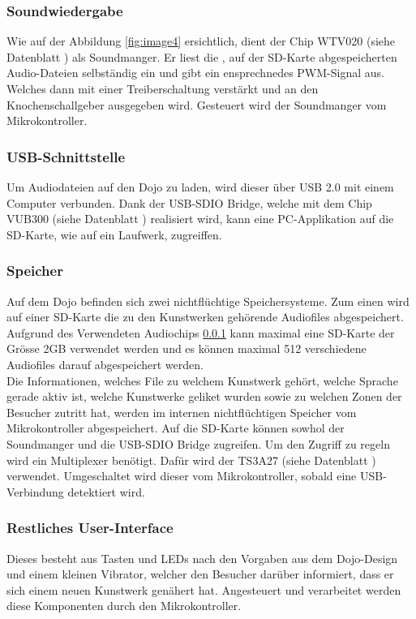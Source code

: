 \documentclass[10pt,a4paper,oneside]{99_fhnwreport}
\begin{document}
\subsubsection{Soundwiedergabe} \label{sec:sound}
Wie auf der Abbildung \ref{fig:image4} ersichtlich, dient der Chip WTV020 (siehe Datenblatt \cite{WTV020}) als Soundmanger. Er liest die , auf der SD-Karte abgespeicherten Audio-Dateien selbständig ein und gibt ein ensprechnedes PWM-Signal aus. Welches dann mit einer Treiberschaltung verstärkt und an den Knochenschallgeber ausgegeben wird. Gesteuert wird der Soundmanger vom  Mikrokontroller.

\subsubsection{USB-Schnittstelle}
Um Audiodateien auf den Dojo zu laden, wird dieser über USB 2.0 mit einem Computer verbunden. Dank der USB-SDIO Bridge, welche mit dem Chip VUB300 (siehe Datenblatt \cite{VUB300}) realisiert wird, kann eine PC-Applikation auf die SD-Karte, wie auf ein Laufwerk, zugreiffen.

\subsubsection{Speicher}
Auf dem Dojo befinden sich zwei nichtflüchtige Speichersysteme.  Zum einen wird auf einer SD-Karte die zu den Kunstwerken gehörende Audiofiles abgespeichert. Aufgrund des Verwendeten Audiochips \ref{sec:sound} kann maximal eine SD-Karte der Grösse 2GB verwendet werden und es können maximal 512 verschiedene Audiofiles darauf abgespeichert werden.\\
Die Informationen, welches File zu welchem Kunstwerk gehört, welche Sprache gerade aktiv ist, welche Kunstwerke geliket wurden sowie zu welchen Zonen der Besucher zutritt hat, werden im internen nichtflüchtigen Speicher vom Mikrokontroller abgespeichert. Auf die SD-Karte können sowhol der Soundmanger und die USB-SDIO Bridge zugreifen. Um den Zugriff zu regeln wird ein Multiplexer benötigt. Dafür wird der TS3A27 (siehe Datenblatt \cite{TS3A27518E}) verwendet. Umgeschaltet wird dieser vom Mikrokontroller, sobald eine USB-Verbindung detektiert wird.

\subsubsection{Restliches User-Interface}
Dieses besteht aus Tasten und LEDs nach den Vorgaben aus dem Dojo-Design und einem kleinen Vibrator, welcher den Besucher darüber informiert, dass er sich einem neuen Kunstwerk genähert hat. Angesteuert und verarbeitet werden diese Komponenten durch den Mikrokontroller.
\end{document}
